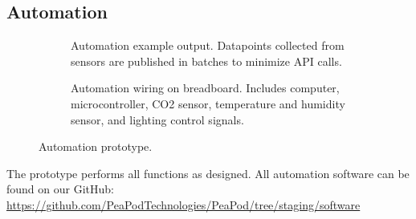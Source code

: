 \subsection{Automation}

\begin{figure}[h!]
  \centering
  \begin{subfigure}{.45\textwidth}
      \centering
      \caption{Automation example output. Datapoints collected from sensors are published in batches to minimize API calls.}
      \label{fig:prototype_automation_datapoints}
    \end{subfigure}
    \hspace{.05\textwidth}
    \begin{subfigure}{.45\textwidth}
      \centering
      \caption{Automation wiring on breadboard. Includes computer, microcontroller, CO2 sensor, temperature and humidity sensor, and lighting control signals.}
      \label{fig:prototype_automation_wiring}
    \end{subfigure}
    \caption{Automation prototype.}
\end{figure}

The prototype performs all functions as designed. All automation software can be found on our GitHub:\\ \href{https://github.com/PeaPodTechnologies/PeaPod/tree/staging/software}{https://github.com/PeaPodTechnologies/PeaPod/tree/staging/software}